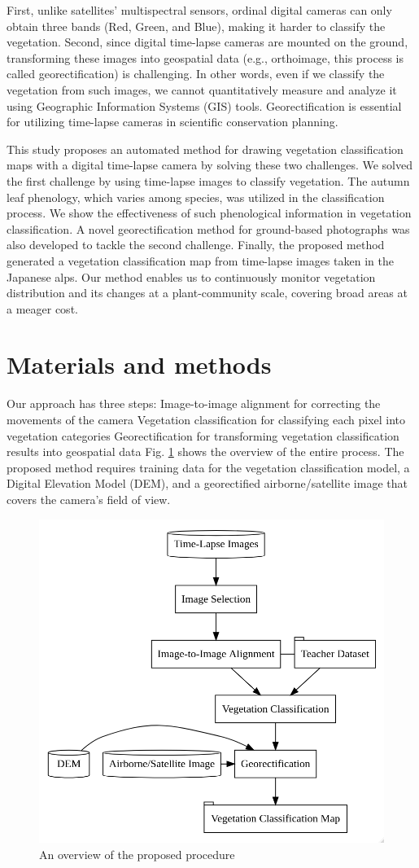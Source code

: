 \documentclass{article}
\begin{document}
First, unlike satellites' multispectral sensors, ordinal digital cameras can only obtain three bands (Red, Green, and Blue), making it harder to classify the vegetation. Second, since digital time-lapse cameras are mounted on the ground, transforming these images into geospatial data (e.g., orthoimage, this process is called georectification) is challenging. In other words, even if we classify the vegetation from such images, we cannot quantitatively measure and analyze it using Geographic Information Systems (GIS) tools. Georectification is essential for utilizing time-lapse cameras in scientific conservation planning.

This study proposes an automated method for drawing vegetation classification maps with a digital time-lapse camera by solving these two challenges. We solved the first challenge by using time-lapse images to classify vegetation. The autumn leaf phenology, which varies among species, was utilized in the classification process. We show the effectiveness of such phenological information in vegetation classification. A novel georectification method for ground-based photographs was also developed to tackle the second challenge. Finally, the proposed method generated a vegetation classification map from time-lapse images taken in the Japanese alps. Our method enables us to continuously monitor vegetation distribution and its changes at a plant-community scale, covering broad areas at a meager cost.

\hypertarget{materials-and-methods}{%
\section{Materials and methods}\label{materials-and-methods}}

Our approach has three steps:
Image-to-image alignment for correcting the movements of the camera
Vegetation classification for classifying each pixel into vegetation categories
Georectification for transforming vegetation classification results into geospatial data
Fig. \ref{fig:diagram} shows the overview of the entire process. The proposed method requires training data for the vegetation classification model, a Digital Elevation Model (DEM), and a georectified airborne/satellite image that covers the camera's field of view.



\begin{figure}
\includegraphics[width=0.5\linewidth]{paper_files/figures/diagram} \caption{An overview of the proposed procedure}\label{fig:diagram}
\end{figure}
\end{document}
